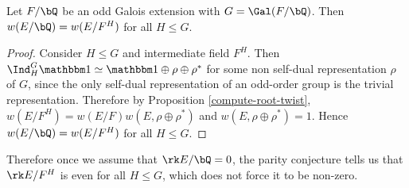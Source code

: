 \begin{lemma}\label{lem_oddroot}
 Let $F / \bQ$ be an odd Galois extension with $G = \Gal(F / \bQ)$. Then $w(E / \bQ) = w(E / F^H)$ for all $H \leq G$. 
\end{lemma}

\begin{proof}
Consider $H \leq G$ and intermediate field $F^H$. Then 
$\Ind_H^G \trivial \simeq \trivial \oplus 
\rho \oplus \rho^*$ for some non self-dual representation $\rho$ of $G$, since the only self-dual representation of an odd-order group is the trivial representation. Therefore by Proposition \ref{compute-root-twist}, $w(E / F^H) = w(E / F)w(E, \rho \oplus \rho^*)$ and $w(E, \rho \oplus \rho^*) = 1$. Hence $w(E / \bQ) = w(E / F^H)$ for all $H \leq G$. 
\end{proof}

Therefore once we assume that $\rk E / \bQ = 0$, the parity conjecture tells us that $\rk E / F^H$ is even for all $H \leq G$, which does not force it to be non-zero. 

